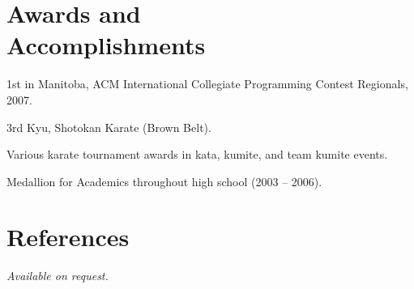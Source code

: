 \documentclass[margin,line,letterpaper]{resume}
\begin{document}
\begin{resume}
  \section{\mysidestyle Awards and\\Accomplishments}

  \begin{list2}
    \item 1st in Manitoba, ACM International Collegiate Programming Contest Regionals, 2007.
    \item 3rd Kyu, Shotokan Karate (Brown Belt).
    \item Various karate tournament awards in kata, kumite, and team kumite events.
    \item Medallion for Academics throughout high school (2003 -- 2006).
  \end{list2}

  \section{\mysidestyle References}

  {\sl Available on request.}

\end{resume}
\end{document}
